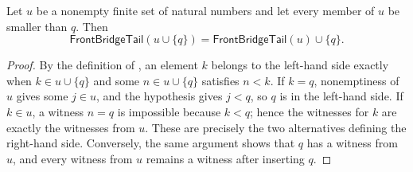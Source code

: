 \begin{helper}
Let $u$ be a nonempty finite set of natural numbers and let every member of
$u$ be smaller than $q$.  Then
\[
 \mathsf{FrontBridgeTail}(u\cup\{q\})
 =\mathsf{FrontBridgeTail}(u)\cup\{q\}.
\]
\end{helper}
\begin{proof}
By the definition of , an element $k$ belongs to
the left-hand side exactly when $k\in u\cup\{q\}$ and some
$n\in u\cup\{q\}$ satisfies $n<k$.  If $k=q$, nonemptiness of $u$ gives
some $j\in u$, and the hypothesis gives $j<q$, so $q$ is in the left-hand
side.  If $k\in u$, a witness $n=q$ is impossible because $k<q$; hence
the witnesses for $k$ are exactly the witnesses from $u$.  These are
precisely the two alternatives defining the right-hand side.  Conversely,
the same argument shows that $q$ has a witness from $u$, and every witness
from $u$ remains a witness after inserting $q$.
\end{proof}
